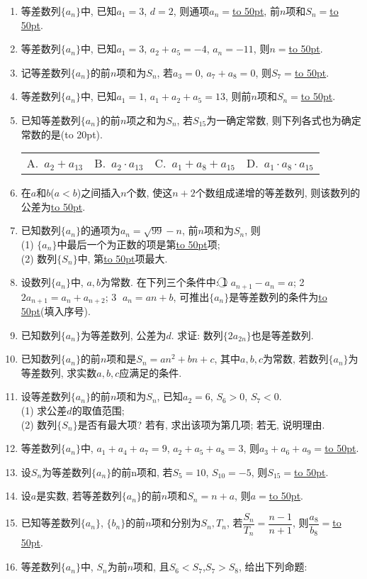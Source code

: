 \documentclass[10pt,a4paper]{article}
\newcommand{\blank}[1]{\underline{\hbox to #1pt{}}}
\newcommand{\bracket}[1]{(\hbox to #1pt{})}
\newcommand{\fourch}[4]{\par\begin{tabular}{p{.23\textwidth}p{.23\textwidth}p{.23\textwidth}p{.23\textwidth}}
A.~#1 &B.~#2& C.~#3& D.~#4
\end{tabular}}
\begin{document}
\begin{enumerate}[1.]
\item 等差数列$\{a_n\}$中, 已知$a_1=3$, $d=2$, 则通项$a_n=$\blank{50}, 前$n$项和$S_n=$\blank{50}.
\item 等差数列$\{a_n\}$中, 已知$a_1=3$, $a_2+a_5=-4$, $a_n=-11$, 则$n=$\blank{50}.
\item 记等差数列$\{a_n\}$的前$n$项和为$S_n$, 若$a_3=0$, $a_7+a_8=0$, 则$S_7=$\blank{50}.
\item 等差数列$\{a_n\}$中, 已知$a_1=1$, $a_1+a_2+a_5=13$, 则前$n$项和$S_n=$\blank{50}.
\item 已知等差数列$\{a_n\}$的前$n$项之和为$S_n$, 若$S_{15}$为一确定常数, 则下列各式也为确定常数的是\bracket{20}.
\fourch{$a_2+a_{13}$}{$a_2\cdot a_{13}$}{$a_1+a_8+a_{15}$}{$a_1\cdot a_8\cdot a_{15}$}
\item 在$a$和$b$($a<b$)之间插入$n$个数, 使这$n+2$个数组成递增的等差数列, 则该数列的公差为\blank{50}.
\item 已知数列$\{a_n\}$的通项为$a_n=\sqrt{99}-n$, 前$n$项和为$S_n$, 则\\
(1) $\{a_n\}$中最后一个为正数的项是第\blank{50}项;\\
(2) 数列$\{S_n\}$中, 第\blank{50}项最大.
\item 设数列$\{a_n\}$中, $a,b$为常数. 在下列三个条件中: \textcircled{1} $a_{n+1}-a_n=a$; \textcircled{2} $2a_{n+1}=a_n+a_{n+2}$; \textcircled{3} $a_n=an+b$, 可推出$\{a_n\}$是等差数列的条件为\blank{50}(填入序号).
\item 已知数列$\{a_n\}$为等差数列, 公差为$d$. 求证: 数列$\{2a_{2n}\}$也是等差数列.
\item 已知数列$\{a_n\}$的前$n$项和是$S_n=an^2+bn+c$, 其中$a,b,c$为常数, 若数列$\{a_n\}$为等差数列, 求实数$a,b,c$应满足的条件.
\item 设等差数列$\{a_n\}$的前$n$项和为$S_n$, 已知$a_2=6$, $S_6>0$, $S_7<0$.\\
(1) 求公差$d$的取值范围;\\
(2) 数列$\{S_n\}$是否有最大项? 若有, 求出该项为第几项; 若无, 说明理由.
\item 等差数列$\{a_n\}$中, $a_1+a_4+a_7=9$, $a_2+a_5+a_8=3$, 则$a_3+a_6+a_9=$\blank{50}.
\item 设$S_n$为等差数列$\{a_n\}$的前n项和, 若$S_5=10$, $S_{10}=-5$, 则$S_{15}=$\blank{50}.
\item 设$a$是实数, 若等差数列$\{a_n\}$的前$n$项和$S_n=n+a$, 则$a=$\blank{50}.
\item 已知等差数列$\{a_n\}$, $\{b_n\}$的前$n$项和分别为$S_n,T_n$, 若$\dfrac{S_n}{T_n}=\dfrac{n-1}{n+1}$, 则$\dfrac{a_8}{b_8}=$\blank{50}.
\item 等差数列$\{a_n\}$中, $S_n$为前$n$项和, 且$S_6<S_7$,$S_7>S_8$, 给出下列命题:\\

\end{enumerate}
\end{document}
